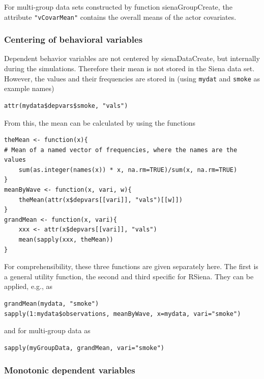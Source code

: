 \documentclass[a4paper,fleqn,11pt]{article}
\newcommand{\+}{\, + \,}
\newcommand{\sfn}[1]{\textsf{#1}}
\newcommand{\rs}{{\sf RSiena}}
\begin{document}
For multi-group data sets constructed by function \sfn{sienaGroupCreate},
the attribute \texttt{"vCovarMean"} contains the overall means
of the actor covariates.


\subsubsection{Centering of behavioral variables}

Dependent behavior variables are not centered by \sfn{sienaDataCreate},
but internally during the simulations.
Therefore their mean is not stored in the Siena data set.
However, the values and their frequencies are stored in
(using \texttt{mydat} and \texttt{smoke} as example names)
\begin{verbatim}
attr(mydata$depvars$smoke, "vals")
\end{verbatim}
From this, the mean can be calculated by using the functions
\begin{verbatim}
theMean <- function(x){
# Mean of a named vector of frequencies, where the names are the values
    sum(as.integer(names(x)) * x, na.rm=TRUE)/sum(x, na.rm=TRUE)
}
meanByWave <- function(x, vari, w){
    theMean(attr(x$depvars[[vari]], "vals")[[w]])
}
grandMean <- function(x, vari){
    xxx <- attr(x$depvars[[vari]], "vals")
    mean(sapply(xxx, theMean))
}
\end{verbatim}
For comprehensibility, these three functions are given separately here.
The first is a general utility function, the second and third specific for \rs.
They can be applied, e.g., as
\begin{verbatim}
grandMean(mydata, "smoke")
sapply(1:mydata$observations, meanByWave, x=mydata, vari="smoke")
\end{verbatim}
and for multi-group data as
\begin{verbatim}
sapply(myGroupData, grandMean, vari="smoke")
\end{verbatim}





\subsubsection{Monotonic dependent variables}
\label{S_monotone}
\end{document}
